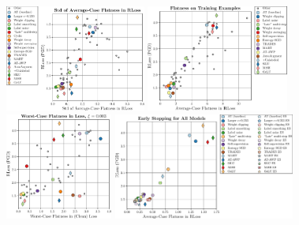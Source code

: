 \begin{figure}[t]
	\centering
	\vspace*{-0.2cm}
	\hspace*{-1.75cm}
	\begin{minipage}[t]{0.28\textwidth}
		\vspace*{0px}
		
		\includegraphics[height=3.5cm]{plots_supp_flatness_correlation_seq_loss_std}
	\end{minipage}
	\begin{minipage}[t]{0.2\textwidth}
		\vspace*{0px}
		
		\includegraphics[height=3.5cm]{plots_supp_flatness_correlation_seq_train_loss}
	\end{minipage}
	\begin{minipage}[t]{0.2\textwidth}
		\vspace*{0px}
		
		\includegraphics[height=3.5cm]{plots_supp_flatness_correlation_adv_loss_e0003}
	\end{minipage}
	\begin{minipage}[t]{0.25\textwidth}
			\vspace*{0px}
			
			\includegraphics[height=3.5cm]{plots_supp_flatness_seq_early_stopping_all}
			

\end{minipage}
\end{figure}
